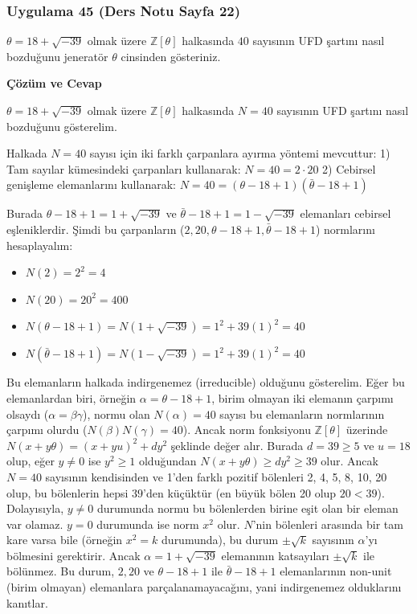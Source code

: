 \documentclass[11pt, a4paper]{article}
\newenvironment{cozum}{
    \vspace{0.5cm}
    \noindent\textcolor{green!60!black}{\faCheckCircle\enspace \textbf{\Large Çözüm ve Cevap}}\par\vspace{0.2cm}
}{}
\begin{document}
\subsubsection{Uygulama 45 (Ders Notu Sayfa 22)}
\begin{sorubox}
$\theta = 18 + \sqrt{-39}$ olmak üzere $\mathbb{Z}[\theta]$ halkasında $40$ sayısının UFD şartını nasıl bozduğunu jeneratör $\theta$ cinsinden gösteriniz.
\end{sorubox}
\begin{cozum}
$\theta = 18 + \sqrt{-39}$ olmak üzere $\mathbb{Z}[\theta]$ halkasında $N = 40$ sayısının UFD şartını nasıl bozduğunu gösterelim.

Halkada $N = 40$ sayısı için iki farklı çarpanlara ayırma yöntemi mevcuttur:
1) Tam sayılar kümesindeki çarpanları kullanarak: $N = 40 = 2 \cdot 20$
2) Cebirsel genişleme elemanlarını kullanarak: $N = 40 = (\theta - 18 + 1)(\bar{\theta} - 18 + 1)$

Burada $\theta - 18 + 1 = 1 + \sqrt{-39}$ ve $\bar{\theta} - 18 + 1 = 1 - \sqrt{-39}$ elemanları cebirsel eşleniklerdir. Şimdi bu çarpanların ($2, 20, \theta - 18 + 1, \bar{\theta} - 18 + 1$) normlarını hesaplayalım:
\begin{itemize}
    \item $N(2) = 2^2 = 4$
    \item $N(20) = 20^2 = 400$
    \item $N(\theta - 18 + 1) = N(1 + \sqrt{-39}) = 1^2 + 39(1)^2 = 40$
    \item $N(\bar{\theta} - 18 + 1) = N(1 - \sqrt{-39}) = 1^2 + 39(1)^2 = 40$
\end{itemize}

Bu elemanların halkada indirgenemez (irreducible) olduğunu gösterelim. Eğer bu elemanlardan biri, örneğin $\alpha = \theta - 18 + 1$, birim olmayan iki elemanın çarpımı olsaydı ($\alpha = \beta \gamma$), normu olan $N(\alpha) = 40$ sayısı bu elemanların normlarının çarpımı olurdu ($N(\beta)N(\gamma) = 40$). Ancak norm fonksiyonu $\mathbb{Z}[\theta]$ üzerinde $N(x+y\theta) = (x+yu)^2 + dy^2$ şeklinde değer alır. Burada $d = 39 \ge 5$ ve $u = 18$ olup, eğer $y \neq 0$ ise $y^2 \ge 1$ olduğundan $N(x+y\theta) \ge dy^2 \ge 39$ olur. Ancak $N = 40$ sayısının kendisinden ve 1'den farklı pozitif bölenleri 2, 4, 5, 8, 10, 20 olup, bu bölenlerin hepsi $39$'den küçüktür (en büyük bölen 20 olup $20 < 39$). Dolayısıyla, $y \neq 0$ durumunda normu bu bölenlerden birine eşit olan bir eleman var olamaz. $y = 0$ durumunda ise norm $x^2$ olur. $N$'nin bölenleri arasında bir tam kare varsa bile (örneğin $x^2 = k$ durumunda), bu durum $\pm \sqrt{k}$ sayısının $\alpha$'yı bölmesini gerektirir. Ancak $\alpha = 1+\sqrt{-39}$ elemanının katsayıları $\pm \sqrt{k}$ ile bölünmez. Bu durum, $2, 20$ ve $\theta - 18 + 1$ ile $\bar{\theta} - 18 + 1$ elemanlarının non-unit (birim olmayan) elemanlara parçalanamayacağını, yani indirgenemez olduklarını kanıtlar.


\end{cozum}
\end{document}
